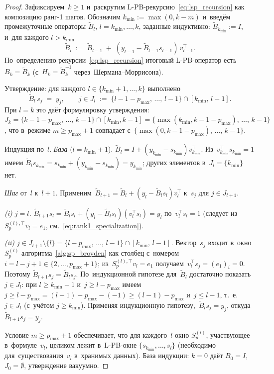 \begin{proof}
Зафиксируем~$k\ge 1$ и~раскрутим L-PB-рекурсию~\eqref{eq:lsp_recursion}
как композицию ранг-1 шагов. Обозначим
$k_{\min}:=\max(0,k-m)$ и~введём промежуточные операторы
$\widetilde B_l$, $l=k_{\min},\ldots,k$, заданные индуктивно:
$\widetilde B_{k_{\min}}:=I$, и~для каждого $l>k_{\min}$
\[
   \widetilde B_l \;:=\; \widetilde B_{l-1}
                       \;+\; (y_{l-1} - \widetilde B_{l-1} s_{l-1})\,v_{l-1}^\top.
\]
По~определению рекурсии~\eqref{eq:lsp_recursion} итоговый L-PB-оператор
есть $B_k=\widetilde B_k$ (с~$H_k=\widetilde B_k^{-1}$ через~Шермана--Моррисона).

Утверждение: для каждого $l\in\{k_{\min}{+}1,\ldots,k\}$ выполнено
\begin{equation}\label{eq:lpb_induct}
   \widetilde B_l\, s_j \;=\; y_j,
   \qquad j\in J_l\;:=\;\{l-1-p_{\max},\,\ldots,\,l-1\}\cap[k_{\min},\,l-1].
\end{equation}
При $l=k$ это даёт формулировку утверждения: $J_k=\{k-1-p_{\max},\,\ldots,\,k-1\}\cap[k_{\min},k-1]
=\{\max(k_{\min},k-1-p_{\max}),\,\ldots,\,k-1\}$, что в~режиме $m\ge p_{\max}+1$
совпадает с~$\{\max(0,k-1-p_{\max}),\,\ldots,\,k-1\}$.

Индукция по~$l$. \emph{База} ($l=k_{\min}+1$). $\widetilde B_l =
I + (y_{k_{\min}} - s_{k_{\min}})v_{k_{\min}}^\top$.
Из~$v_{k_{\min}}^\top s_{k_{\min}}=1$ имеем
$\widetilde B_l s_{k_{\min}}=s_{k_{\min}}+(y_{k_{\min}}-s_{k_{\min}})=y_{k_{\min}}$;
других элементов в~$J_l=\{k_{\min}\}$ нет.

\emph{Шаг} от~$l$ к~$l+1$. Применим~$\widetilde B_{l+1}=\widetilde B_l+
(y_l-\widetilde B_l s_l)v_l^\top$ к~$s_j$ для $j\in J_{l+1}$.

\textit{(i) $j=l$.} $\widetilde B_{l+1} s_l=\widetilde B_l s_l+
(y_l-\widetilde B_l s_l)(v_l^\top s_l)=y_l$ по~$v_l^\top s_l=1$
(следует из~$S_p^{(l),\top}v_l=e_1$, см.~\eqref{eq:rank1_specialization}).

\textit{(ii) $j\in J_{l+1}\setminus\{l\}=\{l-p_{\max},\,\ldots,\,l-1\}\cap[k_{\min},\,l-1]$.}
Вектор~$s_j$ входит в~окно $S_p^{(l)}$ алгоритма~\ref{alg:sp_broyden}
как столбец с~номером $i=l-j+1\in\{2,\ldots,p_{\max}+1\}$; из~$S_p^{(l),\top}v_l=e_1$
получаем~$v_l^\top s_j=(e_1)_i=0$. Поэтому $\widetilde B_{l+1} s_j=
\widetilde B_l s_j$. По~индукционной гипотезе для~$\widetilde B_l$ достаточно
показать~$j\in J_l$: при $l\ge k_{\min}+1$ и~$j\ge l-p_{\max}$ имеем
$j\ge l-p_{\max}=(l-1)-p_{\max}-(-1)\ge(l-1)-p_{\max}$ и~$j\le l-1$,
т.~е.~$j\in J_l$ (с~учётом $j\ge k_{\min}$).
Применяя индукционную гипотезу,~$\widetilde B_l s_j=y_j$,
откуда $\widetilde B_{l+1} s_j=y_j$.

Условие $m\ge p_{\max}+1$ обеспечивает, что для каждого~$l$ окно $S_p^{(l)}$,
участвующее в~формуле~$v_l$, целиком лежит в~L-PB-окне
$\{s_{k_{\min}},\ldots,s_{l}\}$ (необходимо для~существования~$v_l$
в~хранимых данных). База индукции: $k=0$ даёт $B_0=I$, $J_0=\emptyset$,
утверждение вакуумно.
\end{proof}

